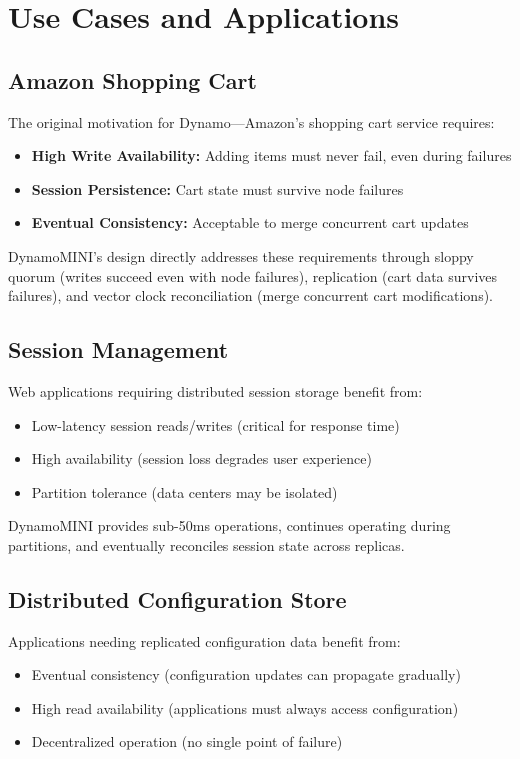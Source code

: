 \documentclass[conference]{IEEEtran}
\begin{document}
\section{Use Cases and Applications}

\subsection{Amazon Shopping Cart}
The original motivation for Dynamo—Amazon's shopping cart service requires:
\begin{itemize}
    \item \textbf{High Write Availability:} Adding items must never fail, even during failures
    \item \textbf{Session Persistence:} Cart state must survive node failures
    \item \textbf{Eventual Consistency:} Acceptable to merge concurrent cart updates
\end{itemize}

DynamoMINI's design directly addresses these requirements through sloppy quorum (writes succeed even with node failures), replication (cart data survives failures), and vector clock reconciliation (merge concurrent cart modifications).

\subsection{Session Management}
Web applications requiring distributed session storage benefit from:
\begin{itemize}
    \item Low-latency session reads/writes (critical for response time)
    \item High availability (session loss degrades user experience)
    \item Partition tolerance (data centers may be isolated)
\end{itemize}

DynamoMINI provides sub-50ms operations, continues operating during partitions, and eventually reconciles session state across replicas.

\subsection{Distributed Configuration Store}
Applications needing replicated configuration data benefit from:
\begin{itemize}
    \item Eventual consistency (configuration updates can propagate gradually)
    \item High read availability (applications must always access configuration)
    \item Decentralized operation (no single point of failure)
\end{itemize}
\end{document}
